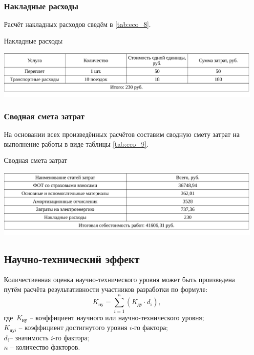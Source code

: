 \subsubsection{Накладные расходы}

Расчёт накладных расходов сведём в \ref{tab:eco_8}.

\begin{table}[!ht]
\caption{Накладные расходы}
\centering
\includegraphics[page=1, width=1\linewidth]{econom_3.pdf}
\label{tab:eco_8}
\end{table}

\subsubsection{Сводная смета затрат}

На основании всех произведённых расчётов составим сводную смету затрат на выполнение работы в виде таблицы \ref{tab:eco_9}.

\begin{table}[!ht]
\caption{Сводная смета затрат}
\centering
\includegraphics[page=1, width=1\linewidth]{econom_4.pdf}
\label{tab:eco_9}
\end{table}

\subsection{Научно-технический эффект}
Количественная оценка научно-технического уровня может быть произведена путём расчёта результативности участников разработки по формуле:
$$K_{\textit{ну}} = \sum_{i=1}^{n}(K_{\textit{ду}}\cdot d_{i}),$$
где\ $K_\textit{ну}$ – коэффициент научного или научно-технического уровня;\\$K_\textit{дуi}$ – коэффициент достигнутого уровня $\textit{i}{}$-го фактора;\\$d_{i}$– значимость $i$-го фактора;\\$\textit{n}$ – количество факторов.

